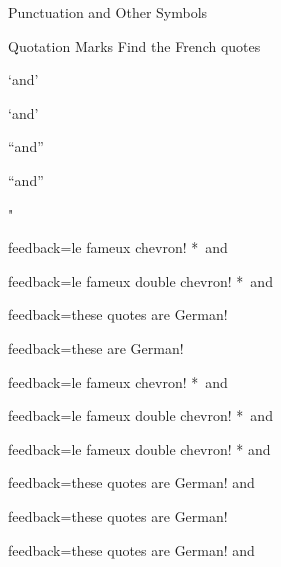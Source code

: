 \documentclass{article}
\begin{document}
\begin{quiz}[points=1,shuffle=false]{Punctuation and Other Symbols}
\begin{multi}[multiple]{Quotation Marks}
Find the French quotes
\item `and'
\item \textquoteleft and\textquoteright
\item ``and''
\item \textquotedblleft and\textquotedblright
\item \textquotesingle
\item "
\item \textquotedbl
\item[feedback={le fameux chevron!}]* \guilsinglleft\,and\,\guilsinglright
\item[feedback={le fameux double chevron!}]* 
\guillemotleft\,and\,\guillemotright
\item[feedback={these quotes are German!}] \quotesinglbase
\item[feedback={these are German!}] \quotedblbase 
\item[feedback={le fameux chevron!}]* \flq\,and\,\frq
\item[feedback={le fameux double chevron!}]* \flqq\,and\,\frqq
\item[feedback={le fameux double chevron!}]* \og and\fg
\item[feedback={these quotes are German!}] \glq and\grq
\item[feedback={these quotes are German!}] \dq
\item[feedback={these quotes are German!}] \glqq and\grqq
\end{multi}
\end{quiz}
\end{document}
